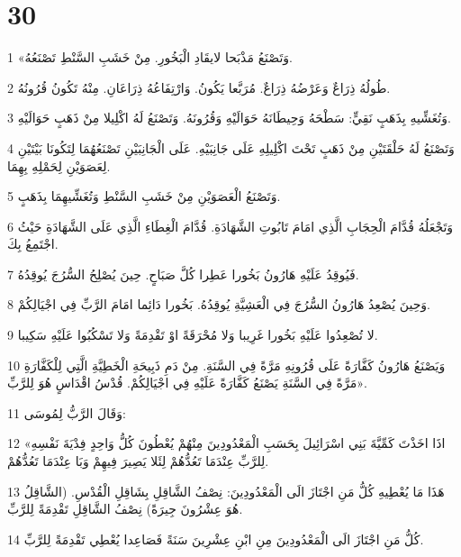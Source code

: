\chapter{30}

\par 1 «وَتَصْنَعُ مَذْبَحا لايقَادِ الْبَخُورِ. مِنْ خَشَبِ السَّنْطِ تَصْنَعُهُ.
\par 2 طُولُهُ ذِرَاعٌ وَعَرْضُهُ ذِرَاعٌ. مُرَبَّعا يَكُونُ. وَارْتِفَاعُهُ ذِرَاعَانِ. مِنْهُ تَكُونُ قُرُونُهُ.
\par 3 وَتُغَشِّيهِ بِذَهَبٍ نَقِيٍّ: سَطْحَهُ وَحِيطَانَهُ حَوَالَيْهِ وَقُرُونَهُ. وَتَصْنَعُ لَهُ اكْلِيلا مِنْ ذَهَبٍ حَوَالَيْهِ.
\par 4 وَتَصْنَعُ لَهُ حَلْقَتَيْنِ مِنْ ذَهَبٍ تَحْتَ اكْلِيلِهِ عَلَى جَانِبَيْهِ. عَلَى الْجَانِبَيْنِ تَصْنَعُهُمَا لِتَكُونَا بَيْتَيْنِ لِعَصَوَيْنِ لِحَمْلِهِ بِهِمَا.
\par 5 وَتَصْنَعُ الْعَصَوَيْنِ مِنْ خَشَبِ السَّنْطِ وَتُغَشِّيهِمَا بِذَهَبٍ.
\par 6 وَتَجْعَلُهُ قُدَّامَ الْحِجَابِ الَّذِي امَامَ تَابُوتِ الشَّهَادَةِ. قُدَّامَ الْغِطَاءِ الَّذِي عَلَى الشَّهَادَةِ حَيْثُ اجْتَمِعُ بِكَ.
\par 7 فَيُوقِدُ عَلَيْهِ هَارُونُ بَخُورا عَطِرا كُلَّ صَبَاحٍ. حِينَ يُصْلِحُ السُّرُجَ يُوقِدُهُ.
\par 8 وَحِينَ يُصْعِدُ هَارُونُ السُّرُجَ فِي الْعَشِيَّةِ يُوقِدُهُ. بَخُورا دَائِما امَامَ الرَّبِّ فِي اجْيَالِكُمْ.
\par 9 لا تُصْعِدُوا عَلَيْهِ بَخُورا غَرِيبا وَلا مُحْرَقَةً اوْ تَقْدِمَةً وَلا تَسْكُبُوا عَلَيْهِ سَكِيبا.
\par 10 وَيَصْنَعُ هَارُونُ كَفَّارَةً عَلَى قُرُونِهِ مَرَّةً فِي السَّنَةِ. مِنْ دَمِ ذَبِيحَةِ الْخَطِيَّةِ الَّتِي لِلْكَفَّارَةِ مَرَّةً فِي السَّنَةِ يَصْنَعُ كَفَّارَةً عَلَيْهِ فِي اجْيَالِكُمْ. قُدْسُ اقْدَاسٍ هُوَ لِلرَّبِّ».
\par 11 وَقَالَ الرَّبُّ لِمُوسَى:
\par 12 «اذَا اخَذْتَ كَمِّيَّةَ بَنِي اسْرَائِيلَ بِحَسَبِ الْمَعْدُودِينَ مِنْهُمْ يُعْطُونَ كُلُّ وَاحِدٍ فِدْيَةَ نَفْسِهِ لِلرَّبِّ عِنْدَمَا تَعُدُّهُمْ لِئَلا يَصِيرَ فِيهِمْ وَبَا عِنْدَمَا تَعُدُّهُمْ.
\par 13 هَذَا مَا يُعْطِيهِ كُلُّ مَنِ اجْتَازَ الَى الْمَعْدُودِينَ: نِصْفُ الشَّاقِلِ بِشَاقِلِ الْقُدْسِ. (الشَّاقِلُ هُوَ عِشْرُونَ جِيرَةً) نِصْفُ الشَّاقِلِ تَقْدِمَةً لِلرَّبِّ.
\par 14 كُلُّ مَنِ اجْتَازَ الَى الْمَعْدُودِينَ مِنِ ابْنِ عِشْرِينَ سَنَةً فَصَاعِدا يُعْطِي تَقْدِمَةً لِلرَّبِّ.
